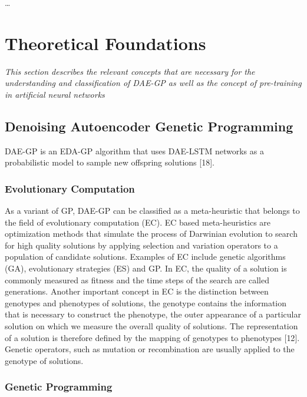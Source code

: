\documentclass[
  11pt,
]{article}
\begin{document}
\ldots{}

\hypertarget{theoretical-foundations}{%
\section{Theoretical Foundations}\label{theoretical-foundations}}

\emph{This section describes the relevant concepts that are necessary for the understanding and classification of DAE-GP as well as the concept of pre-training in artificial neural networks}

\hypertarget{denoising-autoencoder-genetic-programming}{%
\subsection{Denoising Autoencoder Genetic Programming}\label{denoising-autoencoder-genetic-programming}}

DAE-GP is an EDA-GP algorithm that uses DAE-LSTM networks as a probabilistic model to sample new offspring solutions {[}18{]}.

\hypertarget{evolutionary-computation}{%
\subsubsection{Evolutionary Computation}\label{evolutionary-computation}}

As a variant of GP, DAE-GP can be classified as a meta-heuristic that belongs to the field of evolutionary computation (EC).
EC based meta-heuristics are optimization methods that simulate the process of Darwinian evolution to search for high quality solutions by applying selection and variation operators to a population of candidate solutions.
Examples of EC include genetic algorithms (GA), evolutionary strategies (ES) and GP.
In EC, the quality of a solution is commonly measured as fitness and the time steps of the search are called generations.
Another important concept in EC is the distinction between genotypes and phenotypes of solutions, the genotype contains the information that is necessary to construct the phenotype, the outer appearance of a particular solution on which we measure the overall quality of solutions.
The representation of a solution is therefore defined by the mapping of genotypes to phenotypes {[}12{]}.
Genetic operators, such as mutation or recombination are usually applied to the genotype of solutions.

\hypertarget{genetic-programming}{%
\subsubsection{Genetic Programming}\label{genetic-programming}}
\end{document}
